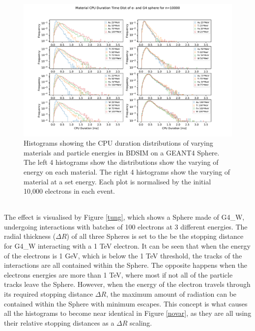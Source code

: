 \documentclass[12pt,a4paper]{article}
\begin{document}
\begin{figure}[h!]
\centering
\includegraphics[scale=0.6]{Images//Materials//Varied_by_radius_and_secondaries.pdf}
\caption[width=\columnwidth]{Histograms showing the CPU duration distributions of varying materials and particle energies in BDSIM on a GEANT4 Sphere. The left 4 histograms show the distributions show the varying of energy on each material. The right 4 histograms show the varying of material at a set energy. Each plot is normalised by the initial 10,000 electrons in each event.}
\label{var}
\end{figure}
\\
\noindent The effect is visualised by Figure \ref{tung}, which shows a Sphere made of G4\_W, undergoing interactions with batches of 100 electrons at 3 different energies. The radial thickness ($\Delta R$) of all three Spheres is set to the be the stopping distance for G4\_W interacting with a 1 TeV electron. It can be seen that when the energy of the electrons is 1 GeV, which is below the 1 TeV threshold, the tracks of the interactions are all contained within the Sphere. The opposite happens when the electrons energies are more than 1 TeV, where most if not all of the particle tracks leave the Sphere. However, when the energy of the electron travels through its required stopping distance $\Delta R$, the maximum amount of radiation can be contained within the Sphere with minimum escapes. This concept is what causes all the histograms to become near identical in Figure \ref{novar}, as they are all using their relative stopping distances as a $\Delta R$ scaling.
\end{document}

